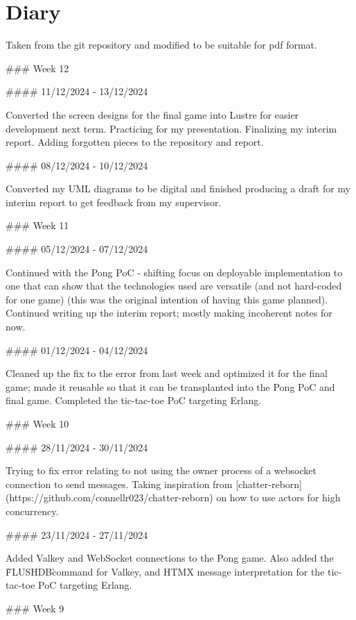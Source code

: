 \documentclass[]{interim}
\begin{document}
\section{Diary}

Taken from the git repository and modified to be suitable for pdf format.

\begin{markdown}

  ### Week 12

  #### 11/12/2024 - 13/12/2024

  Converted the screen designs for the final game into Lustre for easier
  development next term. Practicing for my presentation. Finalizing my interim
  report. Adding forgotten pieces to the repository and report.

  #### 08/12/2024 - 10/12/2024

  Converted my UML diagrams to be digital and finished producing a draft for my
  interim report to get feedback from my supervisor.

  ### Week 11

  #### 05/12/2024 - 07/12/2024

  Continued with the Pong PoC - shifting focus on deployable implementation to one
  that can show that the technologies used are versatile (and not hard-coded for
  one game) (this was the original intention of having this game planned).
  Continued writing up the interim report; mostly making incoherent notes for now.

  #### 01/12/2024 - 04/12/2024

  Cleaned up the fix to the error from last week and optimized it for the final
  game; made it reusable so that it can be transplanted into the Pong PoC and
  final game. Completed the tic-tac-toe PoC targeting Erlang.

  ### Week 10

  #### 28/11/2024 - 30/11/2024

  Trying to fix error relating to not using the owner process of a websocket
  connection to send messages. Taking inspiration from
    [chatter-reborn](https://github.com/connellr023/chatter-reborn) on how to use
  actors for high concurrency.

  #### 23/11/2024 - 27/11/2024

  Added Valkey and WebSocket connections to the Pong game. Also added the
  \`FLUSHDB\` command for Valkey, and HTMX message interpretation for the
  tic-tac-toe PoC targeting Erlang.

  ### Week 9


\end{markdown}
\end{document}
